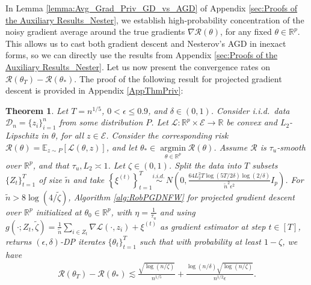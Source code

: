 \documentclass{article}
\newtheorem{theorem}{Theorem}
\newcommand{\iid}{i.i.d.{\ }}
\begin{document}
In Lemma \ref{lemma:Avg_Grad_Priv_GD_vs_AGD} of Appendix \ref{sec:Proofs of the Auxiliary Results_Nester}, we establish high-probability concentration of the noisy gradient average around the true gradients $\nabla\mathcal{R}(\theta)$, for any fixed $\theta \in \mathbb{R}^p$. This allows us to cast both gradient descent and Nesterov’s AGD in inexact forms, so we can directly use the results from Appendix \ref{sec:Proofs of the Auxiliary Results_Nester}. Let us now present the convergence rates on $\mathcal{R}(\theta_T) - \mathcal{R}(\theta_*)$.
The proof of the following result for projected gradient descent is provided in Appendix \ref{AppThmPriv}:

\begin{theorem}
\label{theorem:Priv_HT_GD_Smooth}
Let $T = n^{1/5}$, $0 < \epsilon \leq 0.9$, and $\delta \in (0, 1)$. Consider i.i.d.\ data $\mathcal{D}_n = \{z_i\}_{i = 1}^n$ from some distribution $P$. Let $\mathcal{L} : \mathbb{R}^p \times \mathcal{E} \rightarrow \mathbb{R}$ be convex and $L_2$-Lipschitz in $\theta$, for all $z \in \mathcal{E}$. Consider the corresponding risk $\mathcal{R(\theta)} = \mathbb{E}_{z \sim P}[\mathcal{L}(\theta, z)]$, and let $\theta_* \in \mathop{\arg\min}\limits_{\theta \in \mathbb{R}^p}\mathcal{R}(\theta)$. Assume $\mathcal{R}$ is $\tau_u$-smooth over $\mathbb{R}^p$, and that $\tau_u, L_2 \asymp 1$. Let $\zeta \in (0, 1)$. Split the data into $T$ subsets $\{Z_t\}_{t=1}^T$ of size $\widetilde{n}$ and take $\left\{\xi^{(t)}\right\}_{t = 1}^T \overset{\iid}{\sim} N\left(0, \frac{64L_2^2T\log(5T/2
\delta)\log(2/\delta)}{\widetilde{n}^2 \epsilon^2}I_p\right)$. For $\widetilde{n} > 8\log(4/\widetilde{\zeta})$, Algorithm \ref{alg:RobPGDNFW} for projected gradient descent over $\mathbb{R}^p$ initialized at $\theta_0 \in \mathbb{R}^p$, with $\eta = \frac{1}{\tau_u}$ and using $g(\cdot; Z_t, \widetilde{\zeta}) = \frac{1}{\widetilde{n}}\sum_{i \in Z_t}\nabla\mathcal{L}(\cdot, z_i) + \xi^{(t)}$ as gradient estimator at step $t \in [T]$, returns $(\epsilon, \delta)$-DP iterates $\{\theta_t\}_{t = 1}^T$ such that with probability at least $1 - \zeta$, we have
\begin{align*}
\mathcal{R}(\theta_T) - \mathcal{R}(\theta_*) \lesssim \frac{\sqrt{\log(n/\zeta)}}{n^{1/5}} + \frac{\log(n/\delta)\sqrt{\log(n/\zeta)}}{n^{1/2}\epsilon}.
\end{align*}
\end{theorem}
\end{document}
